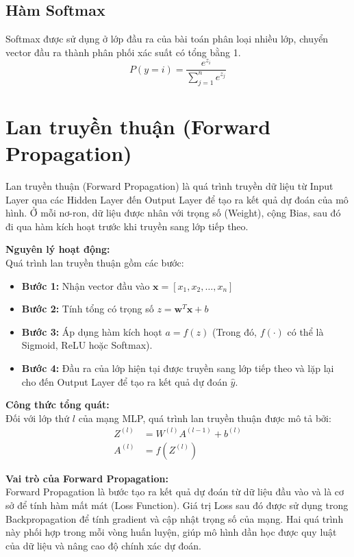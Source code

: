 \documentclass[12pt,a4paper]{report}
\begin{document}
\subsection{Hàm Softmax}
Softmax được sử dụng ở lớp đầu ra của bài toán phân loại nhiều lớp, chuyển vector đầu ra thành phân phối xác suất có tổng bằng 1.
\begin{equation}
    P(y=i) = \frac{e^{z_i}}{\sum_{j=1}^n e^{z_j}}
\end{equation}

\section{Lan truyền thuận (Forward Propagation)}
Lan truyền thuận (Forward Propagation) là quá trình truyền dữ liệu từ Input Layer qua các Hidden Layer đến Output Layer để tạo ra kết quả dự đoán của mô hình. Ở mỗi nơ-ron, dữ liệu được nhân với trọng số (Weight), cộng Bias, sau đó đi qua hàm kích hoạt trước khi truyền sang lớp tiếp theo.

\textbf{Nguyên lý hoạt động:} \\
Quá trình lan truyền thuận gồm các bước:
\begin{itemize}
    \item \textbf{Bước 1:} Nhận vector đầu vào $\mathbf{x} = [x_1, x_2, \dots, x_n]$
    \item \textbf{Bước 2:} Tính tổng có trọng số $z = \mathbf{w}^T \mathbf{x} + b$
    \item \textbf{Bước 3:} Áp dụng hàm kích hoạt $a = f(z)$ (Trong đó, $f(\cdot)$ có thể là Sigmoid, ReLU hoặc Softmax).
    \item \textbf{Bước 4:} Đầu ra của lớp hiện tại được truyền sang lớp tiếp theo và lặp lại cho đến Output Layer để tạo ra kết quả dự đoán $\hat{y}$.
\end{itemize}

\textbf{Công thức tổng quát:} \\
Đối với lớp thứ $l$ của mạng MLP, quá trình lan truyền thuận được mô tả bởi:
\begin{align}
    Z^{(l)} &= W^{(l)} A^{(l-1)} + b^{(l)} \\
    A^{(l)} &= f\left(Z^{(l)}\right)
\end{align}

\textbf{Vai trò của Forward Propagation:} \\
Forward Propagation là bước tạo ra kết quả dự đoán từ dữ liệu đầu vào và là cơ sở để tính hàm mất mát (Loss Function). Giá trị Loss sau đó được sử dụng trong Backpropagation để tính gradient và cập nhật trọng số của mạng. Hai quá trình này phối hợp trong mỗi vòng huấn luyện, giúp mô hình dần học được quy luật của dữ liệu và nâng cao độ chính xác dự đoán.
\end{document}
